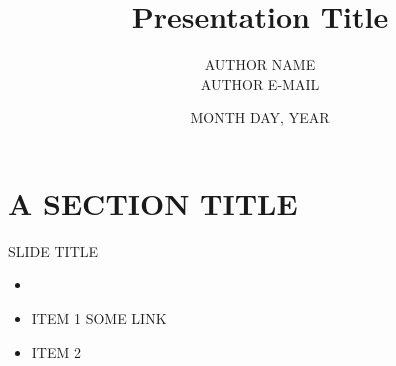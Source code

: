 \documentclass[10pt,dvipsnames, aspectratio=169]{beamer}
\title{Presentation Title}
\date{MONTH DAY, YEAR}
\author{AUTHOR NAME\\
        AUTHOR E-MAIL}
\institute{AUTHOR AFFILIATION}
\begin{document}
\maketitle
\section{A SECTION TITLE}
\begin{frame}[fragile]{SLIDE TITLE}
  \begin{center}
    \begin{itemize}
      \textbf{WPX - WORK PACKAGE TITLE}\item %
      \item ITEM 1
      SOME LINK
      \item ITEM 2
    \end{itemize}
  \end{center}
\end{frame}




\end{document}

